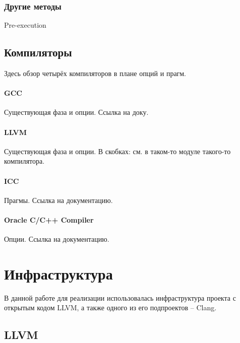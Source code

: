 \documentclass[12pt,a4paper]{article}
\begin{document}
\subsubsection{Другие методы}
Pre-execution

\subsection{Компиляторы}

Здесь обзор четырёх компиляторов в плане опций и прагм.

\paragraph{GCC}

Существующая фаза и опции. Ссылка на доку.

\paragraph{LLVM}

Существующая фаза и опции. В скобках: см. в таком-то модуле такого-то компилятора.

\paragraph{ICC}

Прагмы. Ссылка на документацию.

\paragraph{Oracle C/C++ Compiler}

Опции. Ссылка на документацию.

\section{Инфраструктура}

В данной работе для реализации использовалась инфраструктура проекта с открытым кодом LLVM, а также одного из его подпроектов -- Clang.

\subsection{LLVM}
\end{document}
